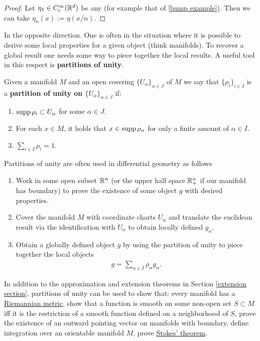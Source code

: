 \documentclass[
    a4paper,
    DIV=14,
    abstract=true,
    numbers=noenddot
]{scrartcl}
\begin{document}
\begin{proof}
	Let $\eta_1 \in C_c^\infty(\mathbb{R}^d)$ be any (for example that of \eqref{bump example}). Then we can take $\eta_n(x):=\eta(x /n)$.
\end{proof}
In the opposite direction. One is often in the situation where it is possible to derive some local properties for a given object (think manifolds). To recover a global result one needs some way to piece together the local results. A useful tool in this respect is \textbf{partitions of unity}.
\begin{definition}
	Given a manifold $M$ and an open covering $\{U_\alpha\}_{\alpha \in  J}$ of $M$ we say that  $\{\rho_i\}_{i\in  I}$ is a \textbf{partition of unity on $\{U_\alpha\}_{\alpha \in  J}$} if:
	\begin{enumerate}
		\item  $\operatorname{supp}{\rho_i}\subset U_\alpha $ for some $\alpha \in J$.
		\item For each $x \in M$, it holds that $x \in \operatorname{supp}{\rho_\alpha}$ for only a finite amount of $\alpha \in I$.
		\item $\sum_{i \in I}\rho _i =1.$
	\end{enumerate}
\end{definition}
Partitions of unity are often used in differential geometry as follows
\begin{enumerate}
	\item Work in some open subset $\mathbb{R}^n$ (or the upper half space $\mathbb{R}^n_+$ if our manifold has boundary) to prove the existence of some object $g$ with desired properties.
	\item  Cover the manifold $M$ with coordinate charts $U_\alpha$ and translate the euclidean result via the identification with $U_\alpha$ to obtain locally defined $g_\alpha$.
	\item Obtain a globally defined object $g$ by using the partition of unity to piece together the local objects
	      \begin{align*}
		      g=\sum_{\alpha \in I}\rho_\alpha g_\alpha .
	      \end{align*}
\end{enumerate}
In addition to the approximation and extension theorems in Section \ref{extension section}, partitions of unity can be used to show that: every manifold has a \href{https://en.wikipedia.org/wiki/Riemannian_manifold}{Riemannian metric}, show that a function is smooth on some non-open set $S \subset M$ iff it is the restriction of a smooth function defined on a neighborhood of $S$, prove the existence of an outward pointing vector on manifolds with boundary, define integration over an orientable manifold $M$, prove \href{https://en.wikipedia.org/wiki/Generalized_Stokes_theorem}{Stokes' theorem}.
\end{document}
